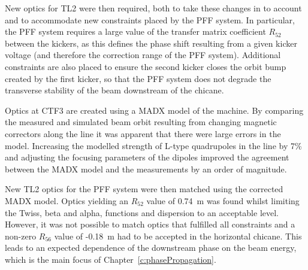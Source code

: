 New optics for TL2 were then required, both to take these changes in to account and to accommodate new constraints placed by the PFF system. In particular, the PFF system requires a large value of the transfer matrix coefficient \(R_{52}\) between the kickers, as this defines the phase shift resulting from a given kicker voltage (and therefore the correction range of the PFF system). Additional constraints are also placed to ensure the second kicker closes the orbit bump created by the first kicker, so that the PFF system does not degrade the transverse stability of the beam downstream of the chicane.

Optics at CTF3 are created using a MADX model of the machine. By comparing the measured and simulated beam orbit resulting from changing magnetic correctors along the line it was apparent that there were large errors in the model.  Increasing the modelled strength of L-type quadrupoles in the line by 7\% and adjusting the focusing parameters of the dipoles improved the agreement between the MADX model and the measurements by an order of magnitude.

New TL2 optics for the PFF system were then matched using the corrected MADX model. Optics yielding an \(R_{52}\) value of 0.74~m was found whilst limiting the Twiss, beta and alpha, functions and dispersion to an acceptable level.
However, it was not possible to match optics that fulfilled all constraints and a non-zero \(R_{56}\) value of -0.18~m had to be accepted in the horizontal chicane. This leads to an expected dependence of the downstream phase on the beam energy, which is the main focus of Chapter~\ref{c:phasePropagation}.